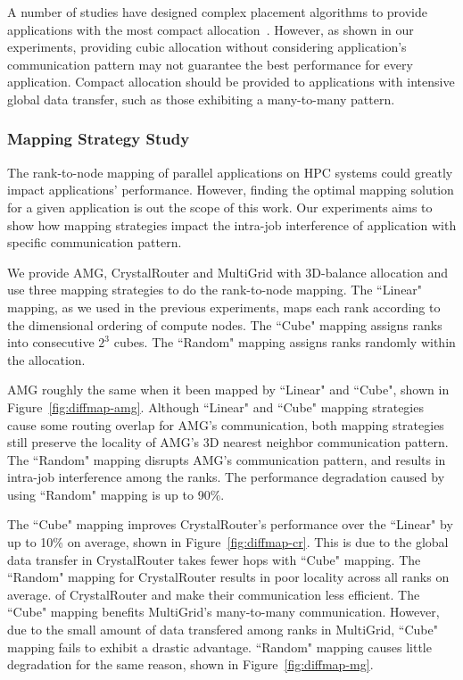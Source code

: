 A number of studies have designed complex placement algorithms 
to provide applications with the most compact allocation~\cite{leung,LO}. 
However, as shown in our experiments, providing cubic allocation without 
considering application's communication pattern may not guarantee 
the best performance for every application. 
Compact allocation should be provided to applications with intensive global data transfer, 
such as those exhibiting a many-to-many pattern. 






\subsubsection{Mapping Strategy Study}
The rank-to-node mapping of parallel applications on HPC systems 
could greatly impact applications' performance. 
However, finding the optimal mapping solution for a given 
application is out the scope of this work. 
Our experiments aims to show how mapping strategies impact the 
intra-job interference of application with specific communication pattern.

We provide AMG, CrystalRouter and MultiGrid with 3D-balance allocation and 
use three mapping strategies to do the rank-to-node mapping. 
The ``Linear" mapping, as we used in the previous experiments, 
maps each rank according to the dimensional ordering of compute nodes. 
The ``Cube" mapping assigns ranks into consecutive $2^{3}$ cubes. 
The ``Random" mapping assigns ranks randomly within the allocation. 

AMG  roughly the same when it been mapped by ``Linear" and ``Cube", 
shown in Figure~\ref{fig:diffmap-amg}. 
Although ``Linear" and ``Cube" mapping strategies cause some routing overlap for AMG's communication, 
both mapping strategies still preserve the locality of AMG's 3D nearest neighbor communication pattern. 
The ``Random" mapping disrupts AMG's communication pattern, 
and results in intra-job interference among the ranks. 
The performance degradation caused by using ``Random" mapping is up to 90\%.

The ``Cube" mapping improves CrystalRouter's performance over the ``Linear" 
by up to 10\% on average, shown in Figure~\ref{fig:diffmap-cr}. 
This is due to the global data transfer in CrystalRouter takes fewer hops with ``Cube" mapping. 
The ``Random" mapping for CrystalRouter results in poor locality across all ranks on average. 
of CrystalRouter and make their communication less efficient. 
The ``Cube" mapping benefits MultiGrid's many-to-many communication. 
However, due to the small amount of data transfered among ranks in MultiGrid, 
``Cube" mapping fails to exhibit a drastic advantage. 
``Random" mapping causes little degradation for the same reason, 
shown in Figure~\ref{fig:diffmap-mg}.


